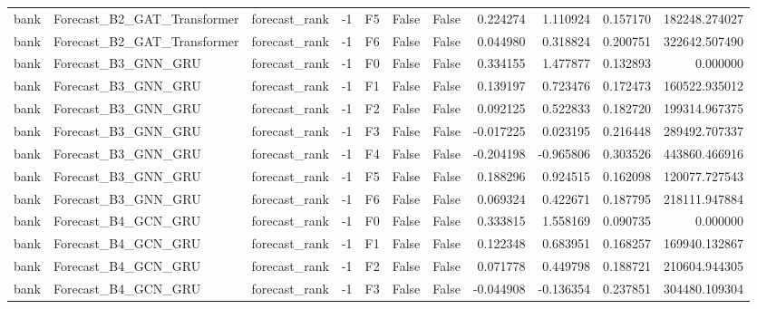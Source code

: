 \begin{tabular}{lllrlllrrrr}
      bank &  Forecast\_B2\_GAT\_Transformer & forecast\_rank &    -1 &  F5 &           False &            False &  0.224274 &  1.110924 & 0.157170 &    182248.274027 \\
      bank &  Forecast\_B2\_GAT\_Transformer & forecast\_rank &    -1 &  F6 &           False &            False &  0.044980 &  0.318824 & 0.200751 &    322642.507490 \\
      bank &          Forecast\_B3\_GNN\_GRU & forecast\_rank &    -1 &  F0 &           False &            False &  0.334155 &  1.477877 & 0.132893 &         0.000000 \\
      bank &          Forecast\_B3\_GNN\_GRU & forecast\_rank &    -1 &  F1 &           False &            False &  0.139197 &  0.723476 & 0.172473 &    160522.935012 \\
      bank &          Forecast\_B3\_GNN\_GRU & forecast\_rank &    -1 &  F2 &           False &            False &  0.092125 &  0.522833 & 0.182720 &    199314.967375 \\
      bank &          Forecast\_B3\_GNN\_GRU & forecast\_rank &    -1 &  F3 &           False &            False & -0.017225 &  0.023195 & 0.216448 &    289492.707337 \\
      bank &          Forecast\_B3\_GNN\_GRU & forecast\_rank &    -1 &  F4 &           False &            False & -0.204198 & -0.965806 & 0.303526 &    443860.466916 \\
      bank &          Forecast\_B3\_GNN\_GRU & forecast\_rank &    -1 &  F5 &           False &            False &  0.188296 &  0.924515 & 0.162098 &    120077.727543 \\
      bank &          Forecast\_B3\_GNN\_GRU & forecast\_rank &    -1 &  F6 &           False &            False &  0.069324 &  0.422671 & 0.187795 &    218111.947884 \\
      bank &          Forecast\_B4\_GCN\_GRU & forecast\_rank &    -1 &  F0 &           False &            False &  0.333815 &  1.558169 & 0.090735 &         0.000000 \\
      bank &          Forecast\_B4\_GCN\_GRU & forecast\_rank &    -1 &  F1 &           False &            False &  0.122348 &  0.683951 & 0.168257 &    169940.132867 \\
      bank &          Forecast\_B4\_GCN\_GRU & forecast\_rank &    -1 &  F2 &           False &            False &  0.071778 &  0.449798 & 0.188721 &    210604.944305 \\
      bank &          Forecast\_B4\_GCN\_GRU & forecast\_rank &    -1 &  F3 &           False &            False & -0.044908 & -0.136354 & 0.237851 &    304480.109304 \\

\end{tabular}
